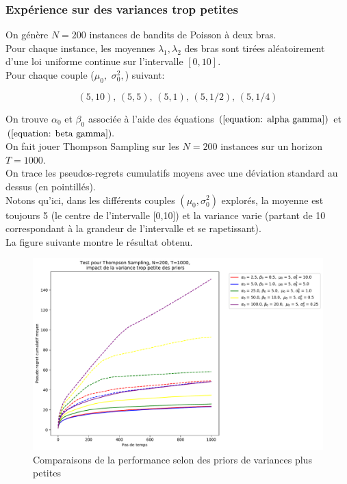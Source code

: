 \documentclass[letterpaper,11pt]{article}
\begin{document}
\subsubsection*{Expérience sur des variances trop petites}

On génère $N=200$ instances de bandits de Poisson à deux bras.\\
Pour chaque instance, les moyennes $\lambda_1, \lambda_2$ des bras sont tirées aléatoirement d'une loi uniforme continue sur l'intervalle $[0,10]$.\\

Pour chaque couple ($\mu_0,$ $\sigma^2_0,$) suivant:

$$(5,10),\,(5,5),\,(5,1),\,(5,1/2),\,(5,1/4)$$

On trouve $\alpha_0$ et $\beta_0$ associée à l'aide des équations $(\ref{equation: alpha gamma})$ et $(\ref{equation: beta gamma}).$
\\

On fait jouer Thompson Sampling sur les $N=200$ instances sur un horizon $T=1000.$\\
 
On trace les pseudos-regrets cumulatifs moyens avec une déviation standard au dessus (en pointillés).\\

Notons qu'ici, dans les différents couples $(\mu_0,\sigma^2_0)$ explorés, la moyenne est toujours 5 (le centre de l'intervalle [0,10]) et la variance varie (partant de 10 correspondant à la grandeur de l'intervalle et se rapetissant).\\

La figure suivante montre le résultat obtenu.

\begin{figure}[H]
\label{figure: variance petite}
\caption{Comparaisons de la performance selon des priors de variances plus petites}
\begin{center}
\includegraphics[scale=0.5]{variance_trop_petites_N=200.pdf}
\end{center}
\end{figure}
\end{document}
